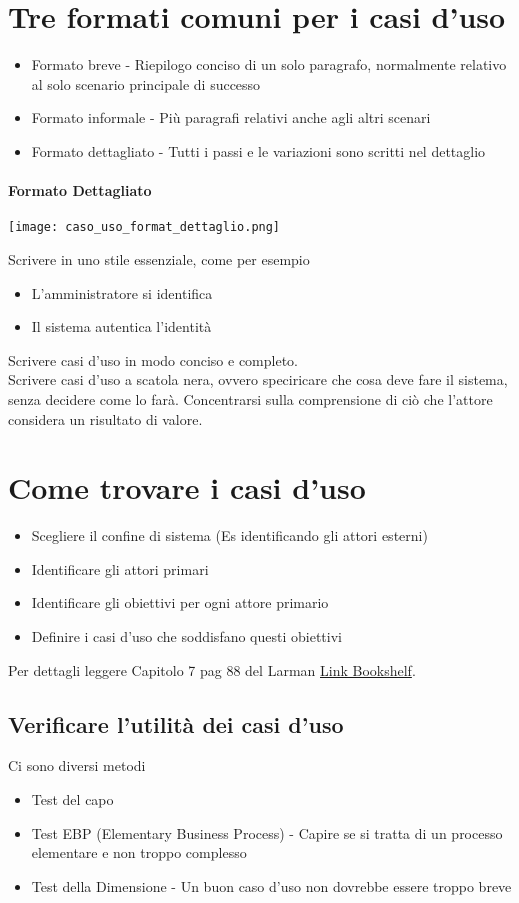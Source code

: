 \section{Tre formati comuni per i casi d'uso}
\begin{itemize}
    \item Formato breve - Riepilogo conciso di un solo paragrafo, normalmente relativo
    al solo scenario principale di successo
    \item Formato informale - Più paragrafi relativi anche agli altri scenari
    \item Formato dettagliato - Tutti i passi e le variazioni sono scritti nel dettaglio
\end{itemize}
\paragraph*{Formato Dettagliato}
\begin{center}
    \texttt{[image: caso\_uso\_format\_dettaglio.png]}
\end{center}
Scrivere in uno stile essenziale, come per esempio
\begin{itemize}
    \item L'amministratore si identifica
    \item Il sistema autentica l'identità
\end{itemize}
Scrivere casi d'uso in modo conciso e completo.
\\ Scrivere casi d'uso a scatola nera, ovvero speciricare che cosa
deve fare il sistema, senza decidere come lo farà.
Concentrarsi sulla comprensione di ciò che l'attore considera un risultato di valore.
\section{Come trovare i casi d'uso}
\begin{itemize}
    \item Scegliere il confine di sistema (Es identificando gli attori esterni)
    \item Identificare gli attori primari
    \item Identificare gli obiettivi per ogni attore primario
    \item Definire i casi d'uso che soddisfano questi obiettivi
\end{itemize}
Per dettagli leggere Capitolo 7 pag 88 del Larman 
\href{https://bookshelf.vitalsource.com/reader/books/9788891924193/pageid/116}{Link Bookshelf}.
\subsection{Verificare l'utilità dei casi d'uso}
Ci sono diversi metodi
\begin{itemize}
    \item Test del capo
    \item Test EBP (Elementary Business Process) - Capire se si tratta di un processo
    elementare e non troppo complesso
    \item Test della Dimensione - Un buon caso d'uso non dovrebbe essere troppo
    breve
\end{itemize}
